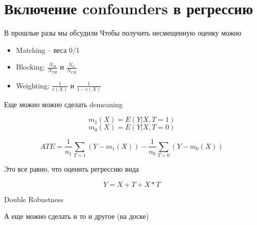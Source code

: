 
\section{Включение confounders в регрессию}

\begin{frame}{В прошлые разы мы обсудили}
Чтобы получить несмещенную оценку можно 
\begin{itemize}
    \item Matching -- веса 0/1
    \item Blocking: $\frac{N_H}{N_{TH}}$ и $\frac{N_L}{N_{CH}}$
    \item Weighting: $\frac{1}{e(X)}$ и $\frac{1}{1 - e(X)}$
\end{itemize}

\end{frame}

\begin{frame}{Еще можно можно сделать demeaning}

$$m_1(X) = E(Y|X, T=1)$$
$$m_0(X) = E(Y|X, T=0)$$

$$ATE = \frac{1}{n_1}\sum_{T=1}\left(Y - m_1(X)\right) - \frac{1}{n_0}\sum_{T=0}\left(Y - m_0(X)\right)$$

Это все равно, что оценить регрессию вида

$$Y = X + T + X*T$$


\end{frame}

\begin{frame}{Double Robustness}

А еще можно сделать и то и другое
(на доске)

\end{frame}


